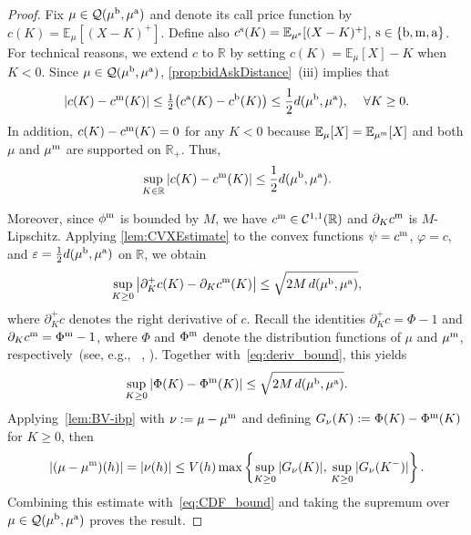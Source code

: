 \documentclass[11pt]{article}
\newcommand{\cC}{\mathcal{C}}
\newcommand{\cQ}{\mathcal{Q}}
\newcommand{\R}{\mathbb{R}} %
\theoremstyle{plain}
\theoremstyle{definition}
\theoremstyle{remark}
\newcommand{\E}{\mathbb{E}}
\theoremstyle{plain}
\begin{document}
%
%
\begin{proof} 
Fix $\mu\in\cQ(\mu^{\rm b},\mu^{\rm a})$ and denote its call price function by $c(K)=\E_{\mu}[(X-K)^+]$.  Define also $c^{\rm s}(K)=\E_{\mu^{\rm s}}[(X-K)^+]$, ${\rm s}\in\{{\rm b},{\rm m},{\rm a}\}$. For technical reasons, we extend $c$ to $\R$ by setting $c(K)= \E_{\mu}[X] - K$ when $K<0$.
%
Since $\mu\in\cQ(\mu^{\rm b},\mu^{\rm a})$, \cref{prop:bidAskDistance}~(iii) implies that
\[
|c(K)-c^{\rm m}(K)|
\le \tfrac12\big(c^{\rm a}(K)-c^{\rm b}(K)\big)
\le \frac{1}{2} d(\mu^{\rm b},\mu^{\rm a}), \quad\, \forall K\geq 0.
\]
In addition, $c(K)-c^{\rm m}(K)=0$ for any $K<0$ because $\E_{\mu}[X]=\E_{\mu^{\rm m}}[X]$ and both $\mu$ and $\mu^{\rm m}$ are supported on $\R_+$. Thus,
\[
\sup_{K\in\R}|c(K)-c^{\rm m}(K)| \le \frac{1}{2} d(\mu^{\rm b},\mu^{\rm a}).
\]

Moreover, since $\phi^{\rm m}$ is bounded by $M$, we have $c^{\rm m}\in\cC^{1,1}(\R)$ and $\partial_K c^{\rm m}$ is $M$-Lipschitz. Applying \cref{lem:CVXEstimate} to the convex functions $\psi=c^{\rm m}$, $\varphi=c$, and $\varepsilon=\frac{1}{2} d(\mu^{\rm b},\mu^{\rm a})$ on $\R$, we obtain
\begin{equation}\label{eq:deriv_bound}
\sup_{K\ge 0}\big|\partial_K^{+}c(K)-\partial_K c^{\rm m}(K)\big|
\le \sqrt{2M\,d(\mu^{\rm b},\mu^{\rm a})},
\end{equation}
where $\partial_K^{+}c$ denotes the right derivative of $c$. Recall the identities $\partial_K^{+}c=\Phi-1$ and $\partial_K c^{\rm m}=\Phi^{\rm m}-1$, where $\Phi$ and $\Phi^{\rm m}$ denote the distribution functions of $\mu$ and $\mu^{\rm m}$, respectively~(see, e.g., ~\cite{breeden1978prices}, \cite[Lemma~1]{hobson2010skorokhod}). Together with~\eqref{eq:deriv_bound}, this yields
\begin{equation}\label{eq:CDF_bound}
\sup_{K\ge 0}|\Phi(K)-\Phi^{\rm m}(K)|
\le\sqrt{2M\,d(\mu^{\rm b},\mu^{\rm a})}.
\end{equation}
Applying~\cref{lem:BV-ibp} with $\nu:=\mu-\mu^{\rm m}$ and defining $G_\nu(K):=\Phi(K)-\Phi^{\rm m}(K)$ for $K\geq 0$, then
\[
|(\mu-\mu^{\rm m})(h)|
=|\nu(h)|
\le V(h)\max\left\{
\sup_{K\ge0}|G_\nu(K)|,\,
\sup_{K\ge0}|G_\nu(K^-)|
\right\}.
\]
Combining this estimate with~\eqref{eq:CDF_bound} and taking the supremum over $\mu\in\cQ(\mu^{\rm b},\mu^{\rm a})$ proves the result.


%
%
%
%
%
%
%
%
%
%
%
%
%
%
\end{proof}
\end{document}
